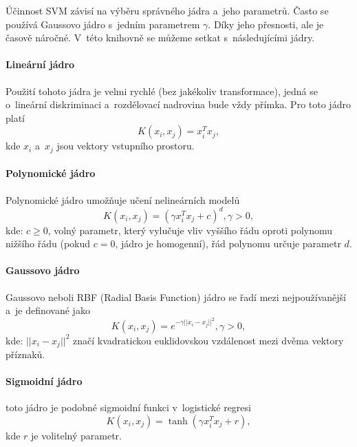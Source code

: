 Účinnost SVM závisí na výběru správného jádra a~jeho parametrů. Často se používá Gaussovo jádro s~jedním parametrem $\gamma$. Díky jeho přesnosti, ale je časově náročné. V~této knihovně se můžeme setkat s~následujícími jádry.

\paragraph*{Lineární jádro} 
Použití tohoto jádra je velmi rychlé (bez jakékoliv transformace), jedná se o~lineární diskriminaci a~rozdělovací nadrovina bude vždy přímka. Pro toto jádro platí 
\begin{equation*}
 \label{linearK}
  K(x_i, x_j) = x_i^T x_j,
\end{equation*}
  kde $x_i$ a~$x_j$ jsou vektory vstupního prostoru.

\paragraph*{Polynomické jádro} 
Polynomické jádro umožňuje učení nelineárních modelů
\begin{equation*}
\label{polyK}
  K(x_i, x_j) = (\gamma x_i^T x_j + c)^{d}, \gamma > 0,
\end{equation*}
kde: $c \geq 0$, volný parametr, který vylučuje vliv vyššího řádu oproti polynomu nižšího řádu (pokud $c = 0$, jádro je homogenní), řád polynomu určuje parametr $d$.

\paragraph*{Gaussovo jádro} 
Gaussovo neboli RBF (Radial Basis Function) jádro se řadí mezi nejpoužívanější a~je definované jako
\begin{equation*}
\label{RBFK}
 K(x_i, x_j) = e^{-\gamma ||x_i - x_j||^2}, \gamma > 0,
\end{equation*}
kde: $||x_i - x_j||^2$ značí kvadratickou euklidovskou vzdálenost mezi dvěma vektory příznaků.

\paragraph*{Sigmoidní jádro} 
toto jádro je podobné sigmoidní funkci v~logistické regresi
\begin{equation*}
\label{sigmK}
 K(x_i, x_j) = \tanh(\gamma x_i^T x_j + r),
\end{equation*}
kde $r$ je volitelný parametr.

